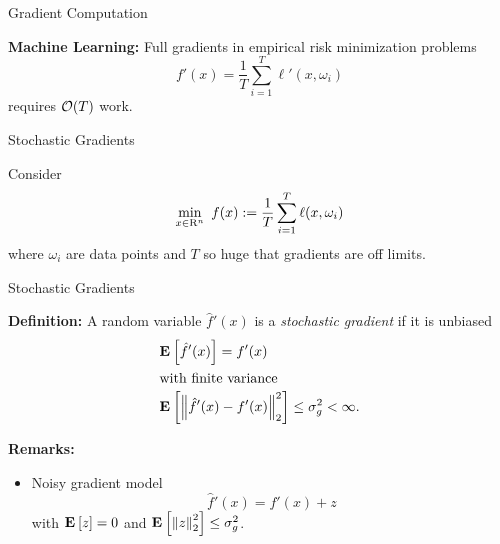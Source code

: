 \documentclass[9pt]{beamer}
\begin{document}
\begin{frame}{Gradient Computation}

  \textbf{Machine Learning:}
  Full gradients in empirical risk minimization problems 
  \[
    f'(x) =  \frac{1}{T} \sum_{i=1}^T \ell'(x, \omega_i)
  \]
  requires $\mathcal O(T)$ work.
  
  \vfill

\end{frame}


\begin{frame}{Stochastic Gradients}

  Consider
  \[
    \min_{x\in\mathrm{R}^n} ~f(x) := \frac{1}{T} \sum_{i=1}^T \ell(x, \omega_i)
  \]
  where $\omega_i$ are data points and $T$ so huge that gradients are off limits.

  \vfill


\end{frame}

\begin{frame}{Stochastic Gradients}

  \textbf{Definition:}
  A random variable $\hat f'(x)$ is a \emph{stochastic gradient} if it is unbiased
  \begin{align*}
    & \mathbf{E}_{} \left[ \hat f '(x) \right]=f'(x)\\
    \intertext{with finite variance}
    &  \mathbf{E}_{} \left[ \left\|\hat f '(x)-f'(x)\right\|_2^2 \right] \leq \sigma_g^2 < \infty.
  \end{align*}

  \vfill

  \textbf{Remarks:}
  \begin{itemize}
  \item Noisy gradient model
    \[
      \hat f '(x) = f'(x) + z
    \]
    with $\mathbf{E}_{} \left[ z \right]=0$ and $\mathbf{E}_{} \left[ \left\|z\right\|^2_2 \right]\leq\sigma_g^2$.
  \end{itemize}
  
\end{frame}
\end{document}
